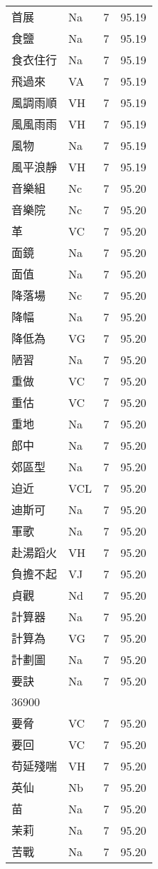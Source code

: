 \documentclass[twocolumn]{book}
\begin{document}
\begin{supertabular}{llrr}
首展 & Na & 7 &  95.19\\
食鹽 & Na & 7 &  95.19\\
食衣住行 & Na & 7 &  95.19\\
飛過來 & VA & 7 &  95.19\\
風調雨順 & VH & 7 &  95.19\\
風風雨雨 & VH & 7 &  95.19\\
風物 & Na & 7 &  95.19\\
風平浪靜 & VH & 7 &  95.19\\
音樂組 & Nc & 7 &  95.20\\
音樂院 & Nc & 7 &  95.20\\
革 & VC & 7 &  95.20\\
面鏡 & Na & 7 &  95.20\\
面值 & Na & 7 &  95.20\\
降落場 & Nc & 7 &  95.20\\
降幅 & Na & 7 &  95.20\\
降低為 & VG & 7 &  95.20\\
陋習 & Na & 7 &  95.20\\
重做 & VC & 7 &  95.20\\
重估 & VC & 7 &  95.20\\
重地 & Na & 7 &  95.20\\
郎中 & Na & 7 &  95.20\\
郊區型 & Na & 7 &  95.20\\
迫近 & VCL & 7 &  95.20\\
迪斯可 & Na & 7 &  95.20\\
軍歌 & Na & 7 &  95.20\\
赴湯蹈火 & VH & 7 &  95.20\\
負擔不起 & VJ & 7 &  95.20\\
貞觀 & Nd & 7 &  95.20\\
計算器 & Na & 7 &  95.20\\
計算為 & VG & 7 &  95.20\\
計劃圖 & Na & 7 &  95.20\\
要訣 & Na & 7 &  95.20\\
36900\\
要脅 & VC & 7 &  95.20\\
要回 & VC & 7 &  95.20\\
苟延殘喘 & VH & 7 &  95.20\\
英仙 & Nb & 7 &  95.20\\
苗 & Na & 7 &  95.20\\
茉莉 & Na & 7 &  95.20\\
苦戰 & Na & 7 &  95.20\\

\end{supertabular}
\end{document}
